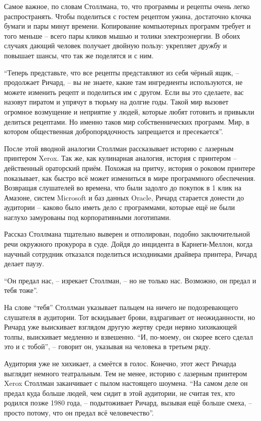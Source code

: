 Самое важное, по словам Столлмана, то, что программы и рецепты очень легко распространять. Чтобы поделиться с гостем рецептом ужина, достаточно клочка бумаги и пары минут времени. Копирование компьютерных программ требует и того меньше -- всего пары кликов мышью и толики электроэнергии. В обоих случаях дающий человек получает двойную пользу: укрепляет дружбу и повышает шансы, что так же поделятся и с ним.

\enquote{Теперь представьте, что все рецепты представляют из себя чёрный ящик, -- продолжает Ричард, -- вы не знаете, какие там ингредиенты используются, не можете изменить рецепт и поделиться им с другом. Если вы это сделаете, вас назовут пиратом и упрячут в тюрьму на долгие годы. Такой мир вызовет огромное возмущение и неприятие у людей, которые любят готовить и привыкли делиться рецептами. Но именно таков мир собственнических программ. Мир, в котором общественная добропорядочность запрещается и пресекается}.

После этой вводной аналогии Столлман рассказывает историю с лазерным принтером Xerox. Так же, как кулинарная аналогия, история с принтером -- действенный ораторский приём. Похожая на притчу, история о роковом принтере показывает, как быстро всё может измениться в мире программного обеспечения. Возвращая слушателей во времена, что были задолго до покупок в 1 клик на Амазоне, систем Microsoft и баз данных Oracle, Ричард старается донести до аудитории -- каково было иметь дело с программами, которые ещё не были наглухо замурованы под корпоративными логотипами.

Рассказ Столлмана тщательно выверен и отполирован, подобно заключительной речи окружного прокурора в суде. Дойдя до инцидента в Карнеги-Меллон, когда научный сотрудник отказался поделиться исходниками драйвера принтера, Ричард делает паузу.

\enquote{Он предал нас, -- изрекает Столлман, -- но не только нас. Возможно, он предал и тебя тоже}.

На слове \enquote{тебя} Столлман указывает пальцем на ничего не подозревающего слушателя в аудитории. Тот вскидывает брови, вздрагивает от неожиданности, но Ричард уже выискивает взглядом другую жертву среди нервно хихикающей толпы, выискивает медленно и взвешенно. \enquote{И, по-моему, он скорее всего сделал это и с тобой}, -- говорит он, указывая на человека в третьем ряду.

Аудитория уже не хихикает, а смеётся в голос. Конечно, этот жест Ричарда выглядит немного театральным. Тем не менее, историю с лазерным принтером Xerox Столлман заканчивает с пылом настоящего шоумена. \enquote{На самом деле он предал куда больше людей, чем сидит в этой аудитории, не считая тех, кто родился позже 1980 года, -- подытоживает Ричард, вызывая ещё больше смеха, -- просто потому, что он предал всё человечество}.

